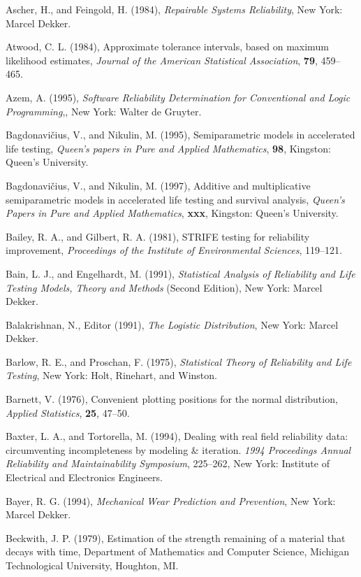 \begin{thebibliography}{999}
Ascher, H., and Feingold, H. (1984),
{\em Repairable Systems Reliability}, New York: Marcel Dekker.

Atwood, C. L. (1984), Approximate tolerance intervals, based on
maximum likelihood estimates, {\em Journal of the American Statistical
Association}, {\bf 79}, 459--465.


Azem, A. (1995), {\em Software Reliability Determination for
Conventional and Logic Programming},, New York: Walter de Gruyter.


Bagdonavi\v{c}ius, V., and Nikulin, M. (1995), Semiparametric models in
accelerated life testing, {\em Queen's papers in Pure and Applied
Mathematics}, {\bf 98}, Kingston: Queen's University.

Bagdonavi\v{c}ius, V., and Nikulin, M. (1997), Additive and
multiplicative semiparametric models in accelerated life testing and
survival analysis, {\em Queen's Papers in Pure and Applied
Mathematics}, {\bf xxx}, Kingston: Queen's University.

Bailey, R. A., and Gilbert, R. A. (1981), STRIFE testing for
reliability improvement, {\em Proceedings of the Institute of
Environmental Sciences}, 119--121.

Bain, L. J., and Engelhardt, M. (1991), {\em Statistical Analysis of
Reliability and Life Testing Models, Theory and Methods} (Second
Edition), New York: Marcel Dekker.

Balakrishnan, N., Editor (1991), {\em The Logistic Distribution}, New
York: Marcel Dekker.

Barlow, R. E., and Proschan, F. (1975), {\em Statistical Theory of
Reliability and Life Testing}, New York: Holt, Rinehart, and Winston.

Barnett, V. (1976), Convenient plotting positions for the normal
distribution, {\em Applied Statistics}, {\bf 25}, 47--50.

Baxter, L. A., and Tortorella, M. (1994), Dealing with real field
reliability data: circumventing incompleteness by modeling \&
iteration.  {\em 1994 Proceedings Annual Reliability and
Maintainability Symposium}, 225--262, New York: Institute of
Electrical and Electronics Engineers.

Bayer, R. G. (1994), {\em Mechanical Wear Prediction and Prevention},
New York: Marcel Dekker.

Beckwith, J. P. (1979), Estimation of the strength remaining of a
material that decays with time, Department of Mathematics and Computer
Science, Michigan Technological University, Houghton, MI.


\end{thebibliography}

